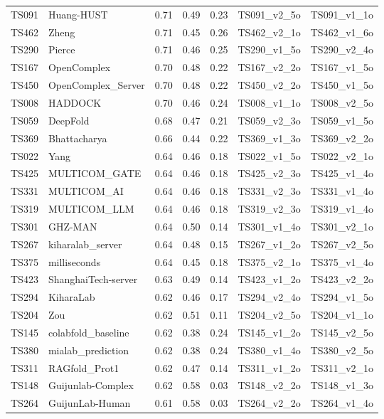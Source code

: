 \begin{longtable}{lllllll}
TS091 & Huang-HUST & 0.71 & 0.49 & 0.23 & TS091\_v2\_5o & TS091\_v1\_1o \\ 
TS462 & Zheng & 0.71 & 0.45 & 0.26 & TS462\_v2\_1o & TS462\_v1\_6o \\ 
TS290 & Pierce & 0.71 & 0.46 & 0.25 & TS290\_v1\_5o & TS290\_v2\_4o \\ 
TS167 & OpenComplex & 0.70 & 0.48 & 0.22 & TS167\_v2\_2o & TS167\_v1\_5o \\ 
TS450 & OpenComplex\_Server & 0.70 & 0.48 & 0.22 & TS450\_v2\_2o & TS450\_v1\_5o \\ 
TS008 & HADDOCK & 0.70 & 0.46 & 0.24 & TS008\_v1\_1o & TS008\_v2\_5o \\ 
TS059 & DeepFold & 0.68 & 0.47 & 0.21 & TS059\_v2\_3o & TS059\_v1\_5o \\ 
TS369 & Bhattacharya & 0.66 & 0.44 & 0.22 & TS369\_v1\_3o & TS369\_v2\_2o \\ 
TS022 & Yang & 0.64 & 0.46 & 0.18 & TS022\_v1\_5o & TS022\_v2\_1o \\ 
TS425 & MULTICOM\_GATE & 0.64 & 0.46 & 0.18 & TS425\_v2\_3o & TS425\_v1\_4o \\ 
TS331 & MULTICOM\_AI & 0.64 & 0.46 & 0.18 & TS331\_v2\_3o & TS331\_v1\_4o \\ 
TS319 & MULTICOM\_LLM & 0.64 & 0.46 & 0.18 & TS319\_v2\_3o & TS319\_v1\_4o \\ 
TS301 & GHZ-MAN & 0.64 & 0.50 & 0.14 & TS301\_v1\_4o & TS301\_v2\_1o \\ 
TS267 & kiharalab\_server & 0.64 & 0.48 & 0.15 & TS267\_v1\_2o & TS267\_v2\_5o \\ 
TS375 & milliseconds & 0.64 & 0.45 & 0.18 & TS375\_v2\_1o & TS375\_v1\_4o \\ 
TS423 & ShanghaiTech-server & 0.63 & 0.49 & 0.14 & TS423\_v1\_2o & TS423\_v2\_2o \\ 
TS294 & KiharaLab & 0.62 & 0.46 & 0.17 & TS294\_v2\_4o & TS294\_v1\_5o \\ 
TS204 & Zou & 0.62 & 0.51 & 0.11 & TS204\_v2\_5o & TS204\_v1\_1o \\ 
TS145 & colabfold\_baseline & 0.62 & 0.38 & 0.24 & TS145\_v1\_2o & TS145\_v2\_5o \\ 
TS380 & mialab\_prediction & 0.62 & 0.38 & 0.24 & TS380\_v1\_4o & TS380\_v2\_5o \\ 
TS311 & RAGfold\_Prot1 & 0.62 & 0.47 & 0.14 & TS311\_v1\_2o & TS311\_v2\_1o \\ 
TS148 & Guijunlab-Complex & 0.62 & 0.58 & 0.03 & TS148\_v2\_2o & TS148\_v1\_3o \\ 
TS264 & GuijunLab-Human & 0.61 & 0.58 & 0.03 & TS264\_v2\_2o & TS264\_v1\_4o \\ 

\end{longtable}
